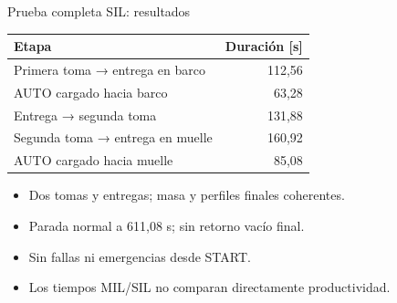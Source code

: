 \documentclass[aspectratio=169,11pt]{beamer}
\begin{document}
\begin{frame}[t,label=slide73]{Prueba completa SIL: resultados}
\begin{center}
{\small\renewcommand{\arraystretch}{1.0}
\begin{tabular}{lr}\toprule
Etapa & Duración [s]\\\midrule
Primera toma → entrega en barco & 112,56\\
AUTO cargado hacia barco & 63,28\\
Entrega → segunda toma & 131,88\\
Segunda toma → entrega en muelle & 160,92\\
AUTO cargado hacia muelle & 85,08\\
\bottomrule\end{tabular}}\end{center}
\begin{itemize}
\item Dos tomas y entregas; masa y perfiles finales coherentes.
\item Parada normal a 611,08 s; sin retorno vacío final.
\item Sin fallas ni emergencias desde START.
\item Los tiempos MIL/SIL no comparan directamente productividad.
\end{itemize}
\end{frame}
\end{document}
